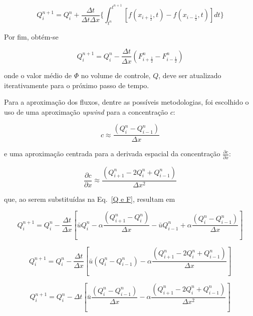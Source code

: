 \begin{equation*}
    Q_i^{n+1} = Q_i^n + \frac{\Delta t}{\Delta t \Delta x} \Bigg\{
    \int_{t^n}^{t^{n+1}} [f(x_{i+\frac{1}{2}},t) - f(x_{i-\frac{1}{2}},t)]dt
    \Bigg\}
\end{equation*}

\noindent Por fim, obtém-se

\begin{equation}\label{Q e F}
    Q_i^{n+1} = Q_i^n - \frac{\Delta t}{\Delta x}(F_{i+\frac{1}{2}}^n -
    F_{i-\frac{1}{2}}^n)
\end{equation}

\noindent onde o valor médio de $\Phi$ no volume de controle, $Q$, deve
ser atualizado iterativamente para o próximo passo de tempo.

Para a aproximação dos fluxos, dentre as possíveis metodologias, foi escolhido o
uso de uma aproximação \emph{upwind} para a concentração $c$:

\begin{equation}
    c \approx \frac{(Q_i^n - Q_{i-1}^n)}{\Delta x}
\end{equation}

\noindent e uma aproximação
centrada para a derivada espacial da concentração $\frac{\partial c}{\partial
x}$:

\begin{equation}
    \frac{\partial c}{\partial x} \approx \frac{(Q_{i+1}^n - 2Q_i^n +
    Q_{i-1}^n)}{\Delta x^2}
\end{equation}

\noindent que, ao serem substituídas na Eq.\ \ref{Q e F}, resultam em

\begin{equation*}
     Q_i^{n+1} = Q_i^n - \frac{\Delta t}{\Delta x} \left[
     \bar{u}Q_i^n - \alpha\frac{(Q_{i+1}^n - Q_i^n)}{\Delta x}
     - \bar{u}Q_{i-1}^n + \alpha\frac{(Q_i^n - Q_{i-1}^n)}{\Delta x}
     \right]
\end{equation*}

\begin{equation*}
    Q_i^{n+1} = Q_i^n - \frac{\Delta t}{\Delta x} \left[
    \bar{u}(Q_i^n - Q_{i-1}^n) - \alpha\frac{(Q_{i+1}^n - 2Q_i^n +
    Q_{i-1}^n)}{\Delta x}
    \right]
\end{equation*}

\begin{equation}\label{eq. final}
    Q_i^{n+1} = Q_i^n - \Delta t \left[
    \bar{u}\frac{(Q_i^n - Q_{i-1}^n)}{\Delta x} - \alpha\frac{(Q_{i+1}^n -
    2Q_i^n + Q_{i-1}^n)}{\Delta x^2}
    \right]
\end{equation}